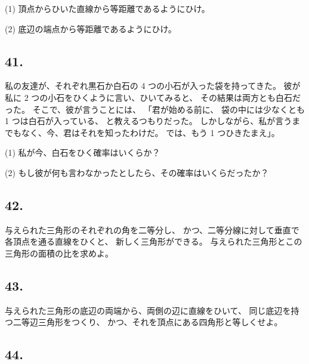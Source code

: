 (1) 頂点からひいた直線から等距離であるようにひけ。

(2) 底辺の端点から等距離であるようにひけ。

\begin{flushright}
[5/76]
\end{flushright}

\subsection*{41.}

私の友達が、それぞれ黒石か白石の 4 つの小石が入った袋を持ってきた。
彼が私に 2 つの小石をひくように言い、ひいてみると、
その結果は両方とも白石だった。
そこで、彼が言うことには、
「君が始める前に、
袋の中には少なくとも 1 つは白石が入っている、
と教えるつもりだった。
しかしながら、私が言うまでもなく、今、君はそれを知ったわけだ。
では、もう 1 つひきたまえ」。

(1) 私が今、白石をひく確率はいくらか？

(2) もし彼が何も言わなかったとしたら、その確率はいくらだったか？

\begin{flushright}
[9/87]
\end{flushright}

\subsection*{42.}

与えられた三角形のそれぞれの角を二等分し、
かつ、二等分線に対して垂直で各頂点を通る直線をひくと、
新しく三角形ができる。
与えられた三角形とこの三角形の面積の比を求めよ。

\begin{flushright}
[17/5/78]
\end{flushright}

\subsection*{43.}

与えられた三角形の底辺の両端から、両側の辺に直線をひいて、
同じ底辺を持つ二等辺三角形をつくり、
かつ、それを頂点にある四角形と等しくせよ。

\begin{flushright}
[2/82]
\end{flushright}

\subsection*{44.}


